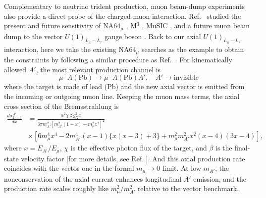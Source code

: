 \documentclass[onecolumn, aps, nofootinbib, prd, preprint, floats, floatfix, amsmath, amssymb, superscriptaddress, preprintnumbers]{revtex4-1}
\begin{document}
Complementary to neutrino trident production, muon beam-dump experiments also provide a direct probe of the charged-muon interaction. Ref.~\cite{Chakraborty:2025jbd} studied the present and future sensitivity of NA64$_\mu$ \cite{NA64:2024nwj}, M$^3$ \cite{Kahn:2018cqs}, MuSIC \cite{Acosta:2021qpx,Acosta:2022ejc}, and a future muon beam dump to the vector $U(1)_{L_\mu-L_\tau}$ gauge boson \cite{Cesarotti:2022ttv}. Back to our axial $U(1)_{L_\mu-L_\tau}$ interaction, here we take the existing NA64$_\mu$ searches as the example to obtain the constraints by following a similar procedure as Ref.~\cite{Chakraborty:2025jbd}.
For kinematically allowed $A'$, the most relevant production channel is
\begin{equation}
\mu^- A(\text{Pb}) \to \mu^- A(\text{Pb}) A', \quad A' \to \text{invisible}
\label{eq:NA64production}
\end{equation}
where the target is made of lead (Pb) \cite{andreev2024exploration} and the new axial vector is emitted from the incoming or outgoing muon line. 
Keeping the muon mass terms, the axial cross section of the Bremsstrahlung is \cite{Chakraborty:2025jbd}
\begin{equation}
\begin{aligned}
\frac{d\sigma^{A'}_{2\to 3}}{dx}
&=\frac{\alpha^2\chi\,\beta\,g_X^2 x}{3\pi m_{A'}^2\left[m_{A'}^2(1-x)+m_\mu^2x^2\right]^2} \\
&\times\left[ 6m_\mu^4x^4 -2m_{A'}^4(x-1)\{x(x-3)+3\} +m_\mu^2m_{A'}^2x^2(x-4)(3x-4) \right],
\label{eq:beamdump-axial-spectrum}
\end{aligned}
\end{equation}
where $x=E_{A'}/E_\mu$, $\chi$ is the effective photon flux of the target, and $\beta$ is the final-state velocity factor [for more details, see Ref. \cite{Chakraborty:2025jbd}].
And this axial production rate coincides with the vector one in the formal $m_\mu\to0$ limit. At low $m_{A'}$, the nonconservation of the axial current enhances longitudinal $A'$ emission, and the production rate scales roughly like $m_\mu^2/m_{A'}^2$ relative to the vector benchmark.
\end{document}
